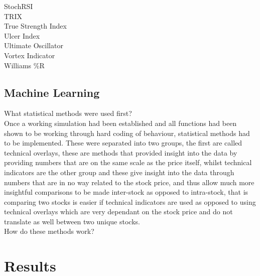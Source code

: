 \documentclass[12pt,a4paper]{article}
\begin{document}
StochRSI \\

TRIX \\

True Strength Index \\

Ulcer Index \\

Ultimate Oscillator \\

Vortex Indicator \\

Williams \%R \\

\iffalse
#################################################################################
\fi

\subsection*{Machine Learning}

What statistical methods were used first?\\

Once a working simulation had been established and all functions had been shown to be working through hard coding of behaviour, statistical methods had to be implemented. These were separated into two groups, the first are called technical overlays, these are methods that provided insight into the data by providing numbers that are on the same scale as the price itself, whilst technical indicators are the other group and these give insight into the data through numbers that are in no way related to the stock price, and thus allow much more insightful comparisons to be made inter-stock as opposed to intra-stock, that is comparing two stocks is easier if technical indicators are used as opposed to using technical overlays which are very dependant on the stock price and do not translate as well between two unique stocks. \\



How do these methods work?\\

\iffalse
#################################################################################
\fi

\section{Results}

\iffalse
this section presents the results of the solutions.  It should include information on experimental settings.  The results should demonstrate the claimed benefits/disadvantages of the proposed solutions.
This section should be between 2 to 3 pages in length.
\fi
\end{document}
